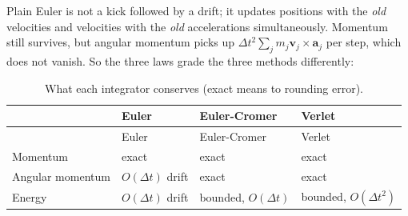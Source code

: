 \documentclass[
  10.5pt,
  letterpaper,
]{scrbook}
\theoremstyle{definition}
\theoremstyle{plain}
\theoremstyle{remark}
\begin{document}
Plain Euler is not a kick followed by a drift; it updates positions with
the \emph{old} velocities and velocities with the \emph{old}
accelerations simultaneously. Momentum still survives, but angular
momentum picks up \(\Delta t^2\sum_j m_j\mathbf{v}_j\times\mathbf{a}_j\)
per step, which does not vanish. So the three laws grade the three
methods differently:

\begin{longtable}[]{@{}
  >{\raggedright\arraybackslash}p{}
  >{\raggedright\arraybackslash}p{}
  >{\raggedright\arraybackslash}p{}
  >{\raggedright\arraybackslash}p{}@{}}
\caption{What each integrator conserves (exact means to rounding
error).}\label{tbl-conservation}\tabularnewline
\toprule\noalign{}
\begin{minipage}[b]{\linewidth}\raggedright
\end{minipage} & \begin{minipage}[b]{\linewidth}\raggedright
Euler
\end{minipage} & \begin{minipage}[b]{\linewidth}\raggedright
Euler-Cromer
\end{minipage} & \begin{minipage}[b]{\linewidth}\raggedright
Verlet
\end{minipage} \\
\midrule\noalign{}
\endfirsthead
\toprule\noalign{}
\begin{minipage}[b]{\linewidth}\raggedright
\end{minipage} & \begin{minipage}[b]{\linewidth}\raggedright
Euler
\end{minipage} & \begin{minipage}[b]{\linewidth}\raggedright
Euler-Cromer
\end{minipage} & \begin{minipage}[b]{\linewidth}\raggedright
Verlet
\end{minipage} \\
\midrule\noalign{}
\endhead
\bottomrule\noalign{}
\endlastfoot
Momentum & exact & exact & exact \\
Angular momentum & \(O(\Delta t)\) drift & exact & exact \\
Energy & \(O(\Delta t)\) drift & bounded, \(O(\Delta t)\) & bounded,
\(O(\Delta t^2)\) \\
\end{longtable}
\end{document}
